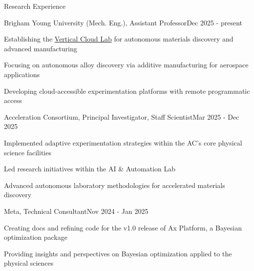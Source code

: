 \documentclass{resume} %
\begin{document}
\begin{rSection}{Research Experience}
\begin{rSubsection}{Brigham Young University (Mech. Eng.), Assistant Professor}{Dec 2025 - present}{} \\
\item Establishing the \href{https://github.com/vertical-cloud-lab}{Vertical Cloud Lab} for autonomous materials discovery and advanced manufacturing
\item Focusing on autonomous alloy discovery via additive manufacturing for aerospace applications
\item Developing cloud-accessible experimentation platforms with remote programmatic access
\end{rSubsection}

\begin{rSubsection}{Acceleration Consortium, Principal Investigator, Staff Scientist}{Mar 2025 - Dec 2025}{} \\
\item Implemented adaptive experimentation strategies within the AC's core physical science facilities
\item Led research initiatives within the AI \& Automation Lab
\item Advanced autonomous laboratory methodologies for accelerated materials discovery
\end{rSubsection}

\begin{rSubsection}{Meta, Technical Consultant}{Nov 2024 - Jan 2025}{} \\
\item Creating docs and refining code for the v1.0 release of Ax Platform, a Bayesian optimization package
\item Providing insights and perspectives on Bayesian optimization applied to the physical sciences
\end{rSubsection}


\end{rSection}
\end{document}
